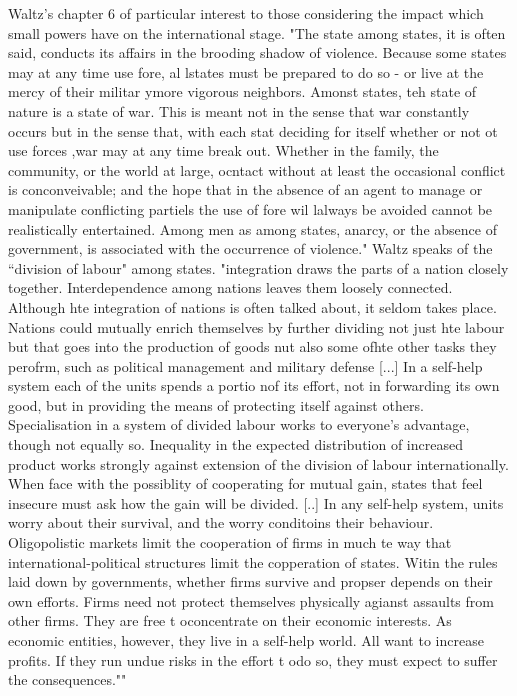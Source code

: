 \documentclass[12pt,a4paper]{article}
\begin{document}
Waltz's chapter 6 of particular interest to those considering the impact which small powers have on the international stage. "The state among states, it is often said, conducts its affairs in the brooding shadow of violence. Because some states may at any time use fore, al lstates must be prepared to do so - or live at the mercy of their militar ymore vigorous neighbors. Amonst states, teh state of nature is a state of war. This is meant not in the sense that war constantly occurs but in the sense that, with each stat deciding for itself whether or not ot use forces ,war may at any time break out. Whether in the family, the community, or the world at large, ocntact without at least the occasional conflict is conconveivable; and the hope that in the absence of an agent to manage or manipulate conflicting partiels the use of fore wil lalways be avoided cannot be realistically entertained. Among men as among states, anarcy, or the absence of government, is associated with the occurrence of violence." Waltz speaks of the ``division of labour" among states. "integration draws the parts of a nation closely together. Interdependence among nations leaves them loosely connected. Although hte integration of nations is often talked about, it seldom takes place. Nations could mutually enrich themselves by further dividing not just hte labour but that goes into the production of goods nut also some ofhte other tasks they perofrm, such as political management and military defense [...] In a self-help system each of the units spends a portio nof its effort, not in forwarding its own good, but in providing the means of protecting itself against others. Specialisation in a system of divided labour works to everyone's advantage, though not equally so. Inequality in the expected distribution of increased product works strongly against extension of the division of labour internationally. When face with the possiblity of cooperating for mutual gain, states that feel insecure must ask how the gain will be divided.  [..] In any self-help system, units worry about their survival, and the worry conditoins their behaviour. Oligopolistic markets limit the cooperation of firms in much te way that international-political structures limit the copperation of states. Witin the rules laid down by governments, whether firms survive and propser depends on their own efforts. Firms need not protect themselves physically agianst assaults from other firms. They are free t oconcentrate on their economic interests. As economic entities, however, they live in a self-help world. All want to increase profits. If they run undue risks in the effort t odo so, they must expect to suffer the consequences.""
\end{document}
